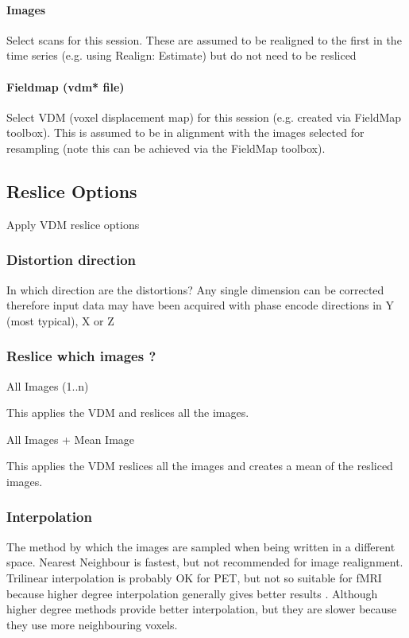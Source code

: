 \paragraph{Images}
Select scans for this session. These are assumed to be realigned to the first in the time series (e.g. using Realign: Estimate) but do not need to be resliced


\paragraph{Fieldmap (vdm* file)}
Select VDM (voxel displacement map) for this session (e.g. created via FieldMap toolbox). This is assumed to be in alignment with the images selected for resampling (note this can be achieved via the FieldMap toolbox).


\subsection{Reslice Options}
Apply VDM reslice options


\subsubsection{Distortion direction}
In which direction are the distortions? Any single dimension can be corrected therefore input data may have been acquired with phase encode directions in Y (most typical), X or Z


\subsubsection{Reslice which images ?}
All Images (1..n) 

  This applies the VDM and reslices all the images. 

All Images + Mean Image 

   This applies the VDM reslices all the images and creates a mean of the resliced images.


\subsubsection{Interpolation}
The method by which the images are sampled when being written in a different space. Nearest Neighbour is fastest, but not recommended for image realignment. Trilinear interpolation is probably OK for PET, but not so suitable for fMRI because higher degree interpolation generally gives better results \cite{thevenaz00a,unser93a,unser93b}. Although higher degree methods provide better interpolation, but they are slower because they use more neighbouring voxels.


